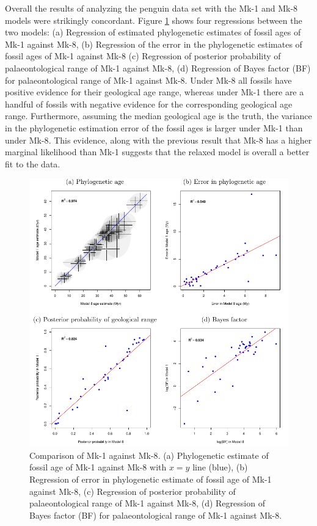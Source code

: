 \documentclass[11pt]{article}
\newcommand{\Mstrict}{{Mk-1}}
\newcommand{\Mrelaxed}{{Mk-8}}
\begin{document}
Overall the results of analyzing the penguin data set with the \Mstrict{} and \Mrelaxed{} models were strikingly concordant. 
Figure \ref{fig:compareM1M8} shows four regressions between the two models: (a) Regression of estimated phylogenetic estimates of fossil ages of \Mstrict{} against \Mrelaxed{}, (b) Regression of the error in the phylogenetic estimates of fossil ages of \Mstrict{} against \Mrelaxed{} (c) Regression of posterior probability of palaeontological range of \Mstrict{} against \Mrelaxed{}, (d) Regression of Bayes factor (BF) for palaeontological range of \Mstrict{} against \Mrelaxed{}. 
Under \Mrelaxed{} all fossils have positive evidence for their geological age range, whereas under \Mstrict{} there are a handful of fossils with negative evidence for the corresponding geological age range. Furthermore, assuming the median geological age is the truth, the variance in the phylogenetic estimation error of the fossil ages is larger under \Mstrict{} than under \Mrelaxed{}.
This evidence, along with the previous result that \Mrelaxed{} has a higher marginal likelihood than \Mstrict{} \cite{gavryushkina2015bayesian} suggests that the relaxed model is overall a better fit to the data. 

\begin{figure}
\includegraphics{Figure_comparison.pdf}
\caption{\label{fig:compareM1M8}
Comparison of \Mstrict{} against \Mrelaxed{}. (a) Phylogenetic estimate of fossil age of \Mstrict{} against \Mrelaxed{} with $x=y$ line (blue), (b) Regression of error in phylogenetic estimate of fossil age of \Mstrict{} against \Mrelaxed{}, (c) Regression of posterior probability of palaeontological range of \Mstrict{} against \Mrelaxed{}, (d) Regression of Bayes factor (BF) for palaeontological range of \Mstrict{} against \Mrelaxed{}.}
\end{figure}
\end{document}
